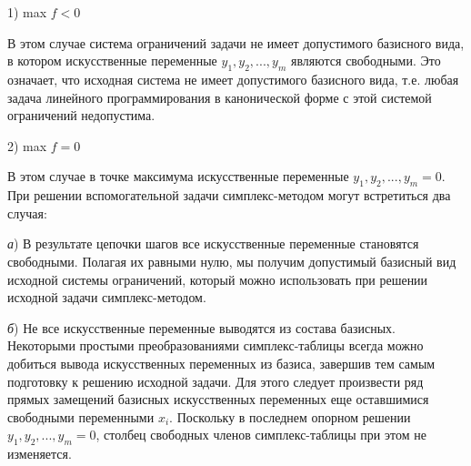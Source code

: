 1) max $f<0$

В этом случае система ограничений задачи не имеет допустимого базисного вида, в котором искусственные переменные $y_{1}, y_{2},..., y_{m}$ являются свободными. Это означает, что исходная система не имеет допустимого базисного вида, т.е. любая задача линейного программирования в канонической форме с этой системой ограничений недопустима.

2) max $f=0$

В этом случае в точке максимума искусственные переменные $y_{1},y_{2},...,y_{m}=0$. При решении вспомогательной задачи симплекс-методом могут встретиться два случая:

\textit{а}) В результате цепочки шагов все искусственные переменные становятся свободными. Полагая их равными нулю, мы получим  допустимый базисный вид исходной системы ограничений, который можно использовать при решении исходной задачи симплекс-методом.

\textit{б}) Не все искусственные переменные выводятся из состава базисных. Некоторыми  простыми преобразованиями симплекс-таблицы всегда можно добиться вывода искусственных переменных из базиса, завершив тем самым подготовку к решению исходной задачи. Для этого следует произвести ряд прямых замещений базисных искусственных переменных еще оставшимися свободными переменными $x_{i}$. Поскольку в последнем опорном решении $y_{1},y_{2},...,y_{m}=0$, столбец свободных членов симплекс-таблицы при этом не изменяется.


